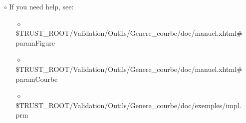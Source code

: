 \documentclass[10pt, hyperref={unicode=true,pdfusetitle, bookmarks=true,bookmarksnumbered=false,bookmarksopen=false, breaklinks=false,pdfborder={0 0 1},backref=true,colorlinks=true,linkcolor=darkblue,pageanchor}]{beamer}
\begin{document}
\begin{frame}
\begin{block}{}
\begin{itemize}
\begin{itemize}
{{    \hspace{0.6cm} \textbf{\}}  \\
    \hspace{0.6cm} \textbf{...}  \\
    \hspace{.3cm} \textbf{\}}  \\
    }}
    \item [$\circ$] If you need help, see:
        \begin{itemize}
        \item [$\diamond$] {\scriptsize{\$TRUST\_ROOT/Validation/Outils/Genere\_courbe/doc/manuel.xhtml\#paramFigure}}
        \item [$\diamond$] {\scriptsize{\$TRUST\_ROOT/Validation/Outils/Genere\_courbe/doc/manuel.xhtml\#paramCourbe}}
        \item [$\diamond$] {\scriptsize{\$TRUST\_ROOT/Validation/Outils/Genere\_courbe/doc/exemples/impl.prm}}
        \end{itemize}
    \end{itemize}
\end{itemize}

\end{block}
\end{frame}
\end{document}
